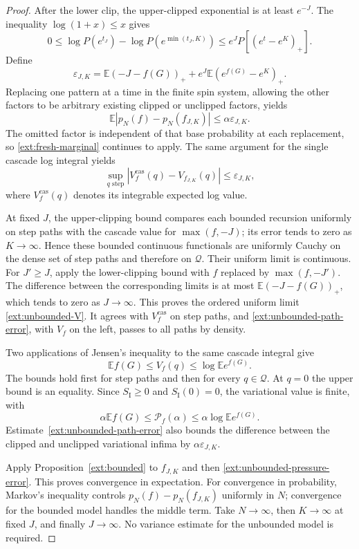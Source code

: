 \begin{proof}
After the lower clip, the upper-clipped exponential is at least $e^{-J}$.
The inequality $\log(1+x)\le x$ gives
\begin{equation}\label{ext:upper-clip}
 0\le \log P(e^{t_J})-\log P(e^{\min(t_J,K)})
 \le e^J P[(e^t-e^K)_+].
\end{equation}
Define
\[
 \varepsilon_{J,K}=
 \mathbb E(-J-f(G))_+
 +e^J\mathbb E(e^{f(G)}-e^K)_+.
\]
Replacing one pattern at a time in the finite spin system, allowing the
other factors to be arbitrary existing clipped or unclipped factors, yields
\begin{equation}\label{ext:unbounded-pressure-error}
 \mathbb E|p_N(f)-p_N(f_{J,K})|\le\alpha\varepsilon_{J,K}.
\end{equation}
The omitted factor is independent of that base probability at each
replacement, so \eqref{ext:fresh-marginal} continues to apply. The same
argument for the single cascade log integral yields
\begin{equation}\label{ext:unbounded-path-error}
 \sup_{q\text{ step}}|V_f^{\mathrm{cas}}(q)-V_{f_{J,K}}(q)|
 \le\varepsilon_{J,K},
\end{equation}
where $V_f^{\mathrm{cas}}(q)$ denotes its integrable expected log value.

At fixed $J$, the upper-clipping bound compares each bounded recursion
uniformly on step paths with the cascade value for $\max(f,-J)$; its
error tends to zero as $K\to\infty$. Hence these bounded continuous
functionals are uniformly Cauchy on the dense set of step paths and
therefore on $\mathcal Q$. Their uniform limit is continuous. For
$J'\ge J$, apply the lower-clipping bound with $f$ replaced by
$\max(f,-J')$. The difference between the corresponding limits is at
most $\mathbb E(-J-f(G))_+$, which tends to zero as $J\to\infty$.
This proves the ordered uniform limit \eqref{ext:unbounded-V}. It agrees
with $V_f^{\mathrm{cas}}$ on step paths, and
\eqref{ext:unbounded-path-error}, with $V_f$ on the left, passes to all
paths by density.

Two applications of Jensen's inequality to the same cascade integral give
\[
 \mathbb E f(G)\le V_f(q)\le\log\mathbb E e^{f(G)}.
\]
The bounds hold first for step paths and then for every $q\in\mathcal Q$.
At $q=0$ the upper bound is an equality. Since $S_{\mathrm I}\ge0$ and
$S_{\mathrm I}(0)=0$, the variational value is finite, with
\[
 \alpha\mathbb E f(G)\le\mathcal P_f(\alpha)
 \le\alpha\log\mathbb E e^{f(G)}.
\]
Estimate~\eqref{ext:unbounded-path-error} also bounds the difference
between the clipped and unclipped variational infima by
$\alpha\varepsilon_{J,K}$.

Apply Proposition~\ref{ext:bounded} to $f_{J,K}$ and then
\eqref{ext:unbounded-pressure-error}. This proves convergence in
expectation. For convergence in probability, Markov's inequality controls
$p_N(f)-p_N(f_{J,K})$ uniformly in $N$; convergence for the bounded model
handles the middle term. Take $N\to\infty$, then $K\to\infty$ at fixed
$J$, and finally $J\to\infty$. No variance estimate for the unbounded
model is required.
\end{proof}

